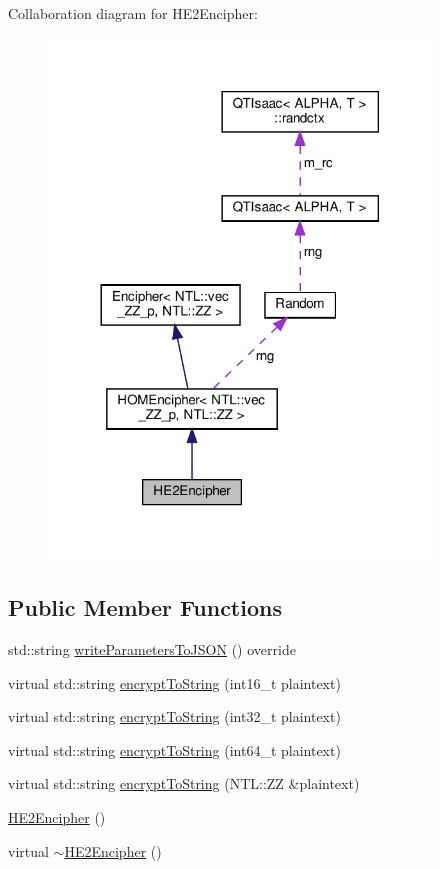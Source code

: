 Collaboration diagram for H\+E2\+Encipher\+:\nopagebreak
\begin{figure}[H]
\begin{center}
\leavevmode
\includegraphics[width=288pt]{classHE2Encipher__coll__graph}
\end{center}
\end{figure}
\subsection*{Public Member Functions}
\begin{DoxyCompactItemize}
\item 
std\+::string \hyperlink{classHE2Encipher_a802a75d83bb833bf458a1e89792026bc}{write\+Parameters\+To\+J\+S\+ON} () override
\item 
virtual std\+::string \hyperlink{classHE2Encipher_a3546d0dfa3e656ec6fcde1c0a4678460}{encrypt\+To\+String} (int16\+\_\+t plaintext)
\item 
virtual std\+::string \hyperlink{classHE2Encipher_a10d552ea918c1c0a67f226745fed3ef6}{encrypt\+To\+String} (int32\+\_\+t plaintext)
\item 
virtual std\+::string \hyperlink{classHE2Encipher_a3c4dfca45e9f65955e64a328910b1339}{encrypt\+To\+String} (int64\+\_\+t plaintext)
\item 
virtual std\+::string \hyperlink{classHE2Encipher_a2b0d3c50f377d3cabe1a102f55ae2b48}{encrypt\+To\+String} (N\+T\+L\+::\+ZZ \&plaintext)
\item 
\hyperlink{classHE2Encipher_ab639560a28321b94af1ae72b7d375f58}{H\+E2\+Encipher} ()
\item 
virtual \hyperlink{classHE2Encipher_aa62b5f97090f8b14eeeff436664ef8e6}{$\sim$\+H\+E2\+Encipher} ()
\end{DoxyCompactItemize}
